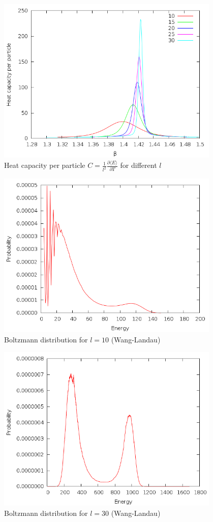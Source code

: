 \documentclass{article}
\begin{document}
\begin{figure}[h]
\includegraphics[height=8cm]{../results/wanglandau/capacity.png}
\caption{Heat capacity per particle $C = \frac{1}{l^2}\frac{\partial\langle E\rangle}{\partial T}$ for different $l$}
\label{fig:capacity}
\end{figure}

\begin{figure}[h]
\includegraphics[height=8cm]{../results/wanglandau/b10.png}
\caption{Boltzmann distribution for $l = 10$ (Wang-Landau)}
\label{fig:b10}
\end{figure}

\begin{figure}[h]
\includegraphics[height=8cm]{../results/wanglandau/b30.png}
\caption{Boltzmann distribution for $l = 30$ (Wang-Landau)}
\label{fig:b30}
\end{figure}
\end{document}
